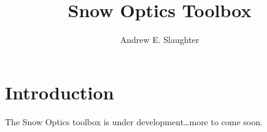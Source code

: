 \documentclass{article}
\title{Snow Optics Toolbox}
\author{Andrew E. Slaughter}
\begin{document}
\maketitle


\section{Introduction}
The Snow Optics toolbox is under development\ldots more to come soon.
\end{document}
